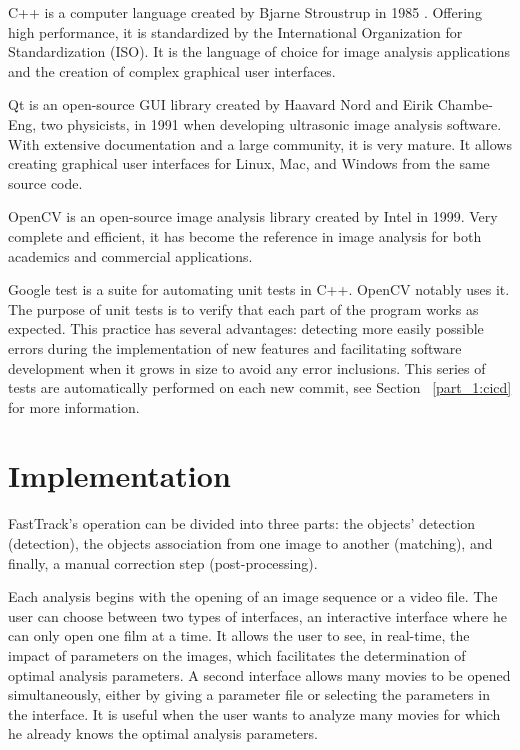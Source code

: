     C++ is a computer language created by Bjarne Stroustrup in 1985 \cite{stroustrup1996history}. Offering high performance, it is standardized by the International Organization for Standardization (ISO). It is the language of choice for image analysis applications and the creation of complex graphical user interfaces.

    Qt is an open-source GUI library created by Haavard Nord and Eirik Chambe-Eng, two physicists, in 1991 when developing ultrasonic image analysis software. With extensive documentation and a large community, it is very mature. It allows creating graphical user interfaces for Linux, Mac, and Windows from the same source code.

    OpenCV is an open-source image analysis library created by Intel in 1999. Very complete and efficient, it has become the reference in image analysis for both academics and commercial applications.

    Google test is a suite for automating unit tests in C++. OpenCV notably uses it. The purpose of unit tests is to verify that each part of the program works as expected. This practice has several advantages: detecting more easily possible errors during the implementation of new features and facilitating software development when it grows in size to avoid any error inclusions. This series of tests are automatically performed on each new commit, see Section ~\ref{part_1:cicd} for more information.

    \section{Implementation}
    FastTrack's operation can be divided into three parts: the objects' detection (detection), the objects association from one image to another (matching), and finally, a manual correction step (post-processing).

    Each analysis begins with the opening of an image sequence or a video file. The user can choose between two types of interfaces, an interactive interface where he can only open one film at a time. It allows the user to see, in real-time, the impact of parameters on the images, which facilitates the determination of optimal analysis parameters. A second interface allows many movies to be opened simultaneously, either by giving a parameter file or selecting the parameters in the interface. It is useful when the user wants to analyze many movies for which he already knows the optimal analysis parameters.

